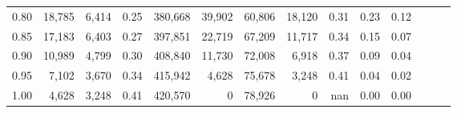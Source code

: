\begin{tabular}{rrrrrrrrrrrrrr}
0.80 &  18,785 &  6,414 &  0.25 &  380,668 &   39,902 &  60,806 &  18,120 &  0.31 &  0.23 &      0.12 \\
0.85 &  17,183 &  6,403 &  0.27 &  397,851 &   22,719 &  67,209 &  11,717 &  0.34 &  0.15 &      0.07 \\
0.90 &  10,989 &  4,799 &  0.30 &  408,840 &   11,730 &  72,008 &   6,918 &  0.37 &  0.09 &      0.04 \\
0.95 &   7,102 &  3,670 &  0.34 &  415,942 &    4,628 &  75,678 &   3,248 &  0.41 &  0.04 &      0.02 \\
1.00 &   4,628 &  3,248 &  0.41 &  420,570 &        0 &  78,926 &       0 &   nan &  0.00 &      0.00 \\
\bottomrule
\end{tabular}
